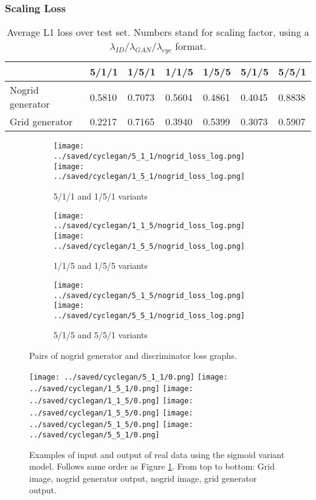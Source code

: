 \subsubsection{Scaling Loss}
\begin{table}[H]
  \centering
  \begin{tabular}{|l|l|l|l|l|l|l|}
    \hline
                     & 5/1/1  & 1/5/1  & 1/1/5  & 1/5/5  & 5/1/5  & 5/5/1  \\ \hline
    Nogrid generator & 0.5810 & 0.7073 & 0.5604 & 0.4861 & 0.4045 & 0.8838 \\ \hline
    Grid generator   & 0.2217 & 0.7165 & 0.3940 & 0.5399 & 0.3073 & 0.5907 \\ \hline
  \end{tabular}
  \caption{Average L1 loss over test set. Numbers stand for scaling factor, using a $\lambda_{ID}/\lambda_{GAN}/\lambda_{cyc}$ format.}\label{fig:cyclegan_perf}
\end{table}

\begin{figure}[H]
  \centering
  \captionsetup{justification=centering}
  \begin{subfigure}[t]{\linewidth}
    \centering
    \caption{5/1/1 and 1/5/1 variants}
    \texttt{[image: ../saved/cyclegan/5\_1\_1/nogrid\_loss\_log.png]}
    \texttt{[image: ../saved/cyclegan/1\_5\_1/nogrid\_loss\_log.png]}
  \end{subfigure}
  \begin{subfigure}[t]{\linewidth}
    \centering
    \caption{1/1/5 and 1/5/5 variants}
    \texttt{[image: ../saved/cyclegan/1\_1\_5/nogrid\_loss\_log.png]}
    \texttt{[image: ../saved/cyclegan/1\_5\_5/nogrid\_loss\_log.png]}
  \end{subfigure}
  \begin{subfigure}[t]{\linewidth}
    \centering
    \caption{5/1/5 and 5/5/1 variants}
    \texttt{[image: ../saved/cyclegan/5\_1\_5/nogrid\_loss\_log.png]}
    \texttt{[image: ../saved/cyclegan/5\_5\_1/nogrid\_loss\_log.png]}
  \end{subfigure}
  \caption[center]{Pairs of nogrid generator and discriminator loss graphs.}\label{image:cyclegan_loss}
\end{figure}

\begin{figure}[H]
  \centering
  \captionsetup{justification=centering}
  \texttt{[image: ../saved/cyclegan/5\_1\_1/0.png]}
  \texttt{[image: ../saved/cyclegan/1\_5\_1/0.png]}
  \texttt{[image: ../saved/cyclegan/1\_1\_5/0.png]}
  \texttt{[image: ../saved/cyclegan/1\_5\_5/0.png]}
  \texttt{[image: ../saved/cyclegan/5\_1\_5/0.png]}
  \texttt{[image: ../saved/cyclegan/5\_5\_1/0.png]}
  \caption[center]{Examples of input and output of real data using the sigmoid variant model. Follows same order as Figure \ref{fig:cyclegan_perf}. From top to bottom: Grid image, nogrid generator output, nogrid image, grid generator output.}\label{image:cyclegan_images}
\end{figure}
